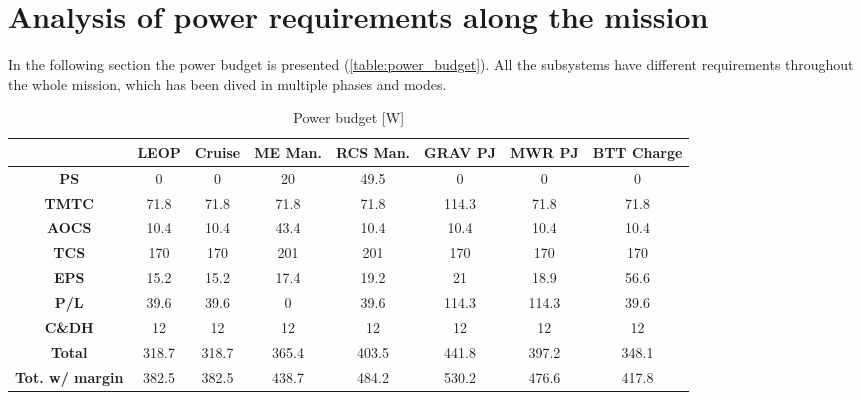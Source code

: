 
\section{Analysis of power requirements along the mission}
\label{sec:EPS_phases}

In the following section the power budget is presented (\autoref{table:power_budget}). All the subsystems have different requirements throughout the whole mission, which has been dived in multiple phases and modes. 
\begin{table}[H]
    \renewcommand{\arraystretch}{1.5}
    \centering
    \begin{tabular}{|c|c|c|c|c|c|c|c|}
        \hline
        & \textbf{LEOP} & \textbf{Cruise} & \textbf{ME Man.} & \textbf{RCS Man.} & \textbf{GRAV PJ} & \textbf{MWR PJ} & \textbf{BTT Charge} \\
        \hline
        \hline
        \textbf{PS} & 0 & 0 & 20 & 49.5 & 0 & 0 & 0 \\
        \hline
        \textbf{TMTC} & 71.8 & 71.8 & 71.8 & 71.8 & 114.3 & 71.8 & 71.8 \\
        \hline
        \textbf{AOCS} & 10.4 & 10.4 & 43.4 & 10.4 & 10.4 & 10.4 & 10.4 \\
        \hline
        \textbf{TCS} & 170 & 170 & 201 & 201 & 170 & 170 & 170 \\
        \hline
        \textbf{EPS} & 15.2 & 15.2 & 17.4 & 19.2 & 21 & 18.9 & 56.6 \\
        \hline
        \textbf{P/L} & 39.6 & 39.6 & 0 & 39.6 & 114.3 & 114.3 & 39.6 \\
        \hline
        \textbf{C\&DH} & 12 & 12 & 12 & 12 & 12 & 12 & 12 \\
        \hline
        \hline
        \textbf{Total} & 318.7 & 318.7 & 365.4 & 403.5 & 441.8 & 397.2 & 348.1 \\
        \hline
        \textbf{Tot. w/ margin} & 382.5 & 382.5 & 438.7 & 484.2 & 530.2 & 476.6 & 417.8 \\
        \hline
    \end{tabular}
    \caption{Power budget [W]}
    \label{table:power_budget}
\end{table}  

\vspace{-3mm}

